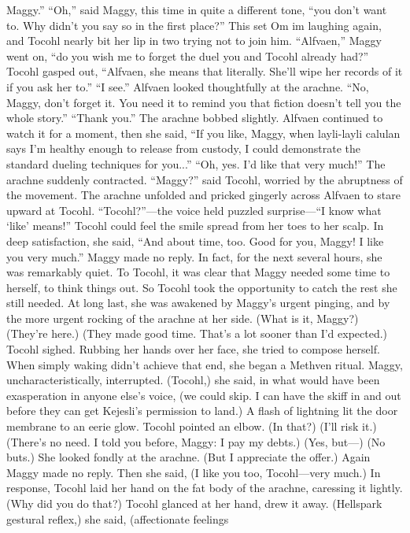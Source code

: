 \documentclass[9pt]{article}
\begin{document}
Maggy.”
“Oh,” said Maggy, this time in quite a different tone, “you don’t want to. Why didn’t you say so in
the first place?”
This set Om im laughing again, and Tocohl nearly bit her lip in two trying not to join him.
“Alfvaen,” Maggy went on, “do you wish me to forget the duel you and Tocohl already had?”
Tocohl gasped out, “Alfvaen, she means that literally. She’ll wipe her records of it if you ask her to.”
“I see.” Alfvaen looked thoughtfully at the arachne. “No, Maggy, don’t forget it. You need it to
remind you that fiction doesn’t tell you the whole story.”
“Thank you.” The arachne bobbed slightly.
Alfvaen continued to watch it for a moment, then she said, “If you like, Maggy, when layli-layli
calulan says I’m healthy enough to release from custody, I could demonstrate the standard dueling
techniques for you...”
“Oh, yes. I’d like that very much!” The arachne suddenly contracted.
“Maggy?” said Tocohl, worried by the abruptness of the movement.
The arachne unfolded and pricked gingerly across Alfvaen to stare upward at Tocohl.
“Tocohl?”—the voice held puzzled surprise—“I know what ‘like’ means!”
Tocohl could feel the smile spread from her toes to her scalp. In deep satisfaction, she said, “And
about time, too. Good for you, Maggy! I like you very much.”
Maggy made no reply. In fact, for the next several hours, she was remarkably quiet. To Tocohl, it
was clear that Maggy needed some time to herself, to think things out. So Tocohl took the opportunity to
catch the rest she still needed.
At long last, she was awakened by Maggy’s urgent pinging, and by the more urgent rocking of the
arachne at her side.
(What is it, Maggy?)
(They’re here.)
(They made good time. That’s a lot sooner than I’d expected.) Tocohl sighed. Rubbing her hands
over her face, she tried to compose herself. When simply waking didn’t achieve that end, she began a
Methven ritual.
Maggy, uncharacteristically, interrupted. (Tocohl,) she said, in what would have been exasperation in
anyone else’s voice, (we could skip. I can have the skiff in and out before they can get Kejesli’s
permission to land.)
A flash of lightning lit the door membrane to an eerie glow. Tocohl pointed an elbow. (In that?)
(I’ll risk it.)
(There’s no need. I told you before, Maggy: I pay my debts.)
(Yes, but—)
(No buts.) She looked fondly at the arachne. (But I appreciate the offer.)
Again Maggy made no reply. Then she said, (I like you too, Tocohl—very much.)
In response, Tocohl laid her hand on the fat body of the arachne, caressing it lightly.
(Why did you do that?)
Tocohl glanced at her hand, drew it away. (Hellspark gestural reflex,) she said, (affectionate feelings
\end{document}
